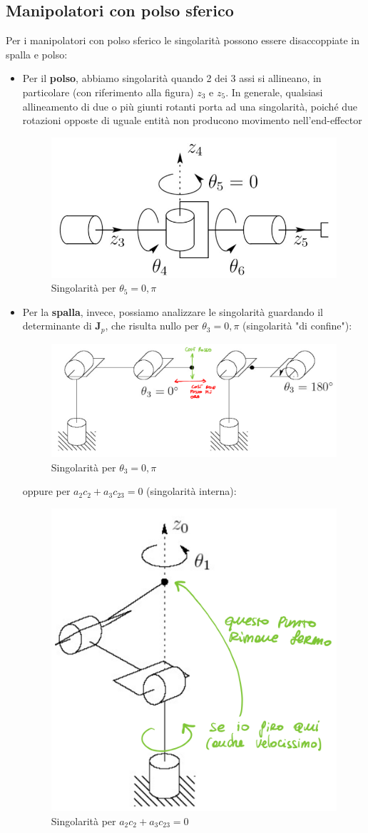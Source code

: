 \subsection{Manipolatori con polso sferico}
Per i manipolatori con polso sferico le singolarità possono essere disaccoppiate in spalla e polso:
\begin{itemize}
	\item Per il \textbf{polso}, abbiamo singolarità quando 2 dei 3 assi si allineano, in particolare (con riferimento alla figura) $z_3$ e $z_5$. In generale, qualsiasi allineamento di due o più giunti rotanti porta ad una singolarità, poiché due rotazioni opposte di uguale entità non producono movimento nell'end-effector
	\begin{figure}[H]
		\centering
		\includegraphics[width=0.35\linewidth]{images/diff_kine_7}
		\caption{Singolarità per $\theta_5 = 0, \pi$}
		\label{fig:diffkine7}
	\end{figure}
	\item Per la \textbf{spalla}, invece, possiamo analizzare le singolarità guardando il determinante di $\bm{J}_p$, che risulta nullo per $\theta_3=0,\pi$ (singolarità "di confine"):
	\begin{figure}[H]
		\centering
		\includegraphics[width=0.4\linewidth]{images/diff_kine_8}
		\caption{Singolarità per $\theta_3=0,\pi$}
		\label{fig:diffkine8}
	\end{figure}
	oppure per $a_2c_2 + a_3c_{23}=0$ (singolarità interna):
	\begin{figure}[H]
		\centering
		\includegraphics[width=0.35\linewidth]{images/diff_kine_9}
		\caption{Singolarità per $a_2c_2 + a_3c_{23}=0$}
		\label{fig:diffkine9}
	\end{figure}
	
\end{itemize}





